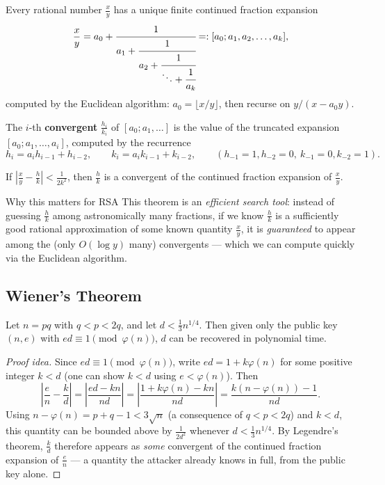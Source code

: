 \begin{definition}
Every rational number $\frac{x}{y}$ has a unique finite continued fraction expansion
\[
\frac{x}{y} = a_0 + \cfrac{1}{a_1 + \cfrac{1}{a_2 + \cfrac{1}{\ddots + \cfrac{1}{a_k}}}} =: [a_0; a_1, a_2, \dots, a_k],
\]
computed by the Euclidean algorithm: $a_0 = \lfloor x/y \rfloor$, then recurse on $y / (x - a_0 y)$.
\end{definition}

\begin{definition}[Convergents]
The $i$-th \textbf{convergent} $\frac{h_i}{k_i}$ of $[a_0;a_1,\dots]$ is the value of the truncated expansion $[a_0;a_1,\dots,a_i]$, computed by the recurrence
\[
h_i = a_i h_{i-1} + h_{i-2}, \qquad k_i = a_i k_{i-1} + k_{i-2}, \qquad (h_{-1}{=}1, h_{-2}{=}0,\ k_{-1}{=}0, k_{-2}{=}1).
\]
\end{definition}

\begin{theorem}
If $\left|\frac{x}{y} - \frac{h}{k}\right| < \frac{1}{2k^2}$, then $\frac{h}{k}$ is a convergent of the continued fraction expansion of $\frac{x}{y}$.
\end{theorem}

\begin{keybox}{Why this matters for RSA}
This theorem is an \emph{efficient search tool}: instead of guessing $\frac{h}{k}$ among astronomically many fractions, if we know $\frac{h}{k}$ is a sufficiently good rational approximation of some known quantity $\frac{x}{y}$, it is \emph{guaranteed} to appear among the (only $O(\log y)$ many) convergents — which we can compute quickly via the Euclidean algorithm.
\end{keybox}

\subsection{Wiener's Theorem}

\begin{theorem}[Wiener, 1990]
Let $n = pq$ with $q < p < 2q$, and let $d < \frac{1}{3} n^{1/4}$. Then given only the public key $(n,e)$ with $ed \equiv 1 \pmod{\varphi(n)}$, $d$ can be recovered in polynomial time.
\end{theorem}

\begin{proof}[Proof idea]
Since $ed \equiv 1 \pmod{\varphi(n)}$, write $ed = 1 + k\varphi(n)$ for some positive integer $k < d$ (one can show $k < d$ using $e < \varphi(n)$). Then
\[
\left|\frac{e}{n} - \frac{k}{d}\right| = \left|\frac{ed - kn}{nd}\right| = \left|\frac{1 + k\varphi(n) - kn}{nd}\right| = \frac{k(n - \varphi(n)) - 1}{nd}.
\]
Using $n - \varphi(n) = p+q-1 < 3\sqrt n$ (a consequence of $q<p<2q$) and $k<d$, this quantity can be bounded above by $\frac{1}{2d^2}$ whenever $d < \frac13 n^{1/4}$. By Legendre's theorem, $\frac{k}{d}$ therefore appears as \emph{some} convergent of the continued fraction expansion of $\frac{e}{n}$ — a quantity the attacker already knows in full, from the public key alone.
\end{proof}

